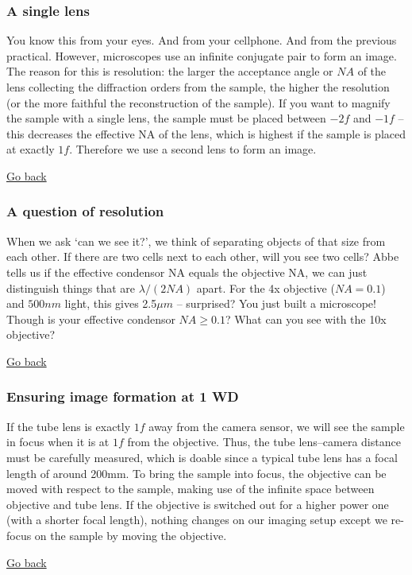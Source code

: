 \documentclass[a4paper]{report}
\begin{document}
	\subsubsection{A single lens}
	You know this from your eyes. And from your cellphone. And from the previous practical. However, microscopes use an infinite conjugate pair to form an image. The reason for this is resolution: the larger the acceptance angle or $NA$ of the lens collecting the diffraction orders from the sample, the higher the resolution (or the more faithful the reconstruction of the sample). If you want to magnify the sample with a single lens, the sample must be placed between $-2f$ and $-1f$ -- this decreases the effective NA of the lens, which is highest if the sample is placed at exactly $1f$. Therefore we use a second lens to form an image.

    \noindent
    \hyperlink{hintBack-imaging}{Go back}
    
	\subsubsection{A question of resolution}
	When we ask `can we see it?', we think of separating objects of that size from each other. If there are two cells next to each other, will you see two cells? Abbe tells us if the effective condensor NA equals the objective NA, we can just distinguish things that are $\lambda / (2NA)$ apart. For the 4x objective ($NA=0.1$) and $500nm$ light, this gives 2.5$\mu m$ -- surprised? You just built a microscope! Though is your effective condensor $NA\geq 0.1$? What can you see with the 10x objective?

    \noindent
    \hyperlink{hintBack-imaging}{Go back}
    
	\subsubsection{Ensuring image formation at 1 WD}
    If the tube lens is exactly $1f$ away from the camera sensor, we will see the sample in focus when it is at $1f$ from the objective. Thus, the tube lens--camera distance must be carefully measured, which is doable since a typical tube lens has a focal length of around 200mm. To bring the sample into focus, the objective can be moved with respect to the sample, making use of the infinite space between objective and tube lens. If the objective is switched out for a higher power one (with a shorter focal length), nothing changes on our imaging setup except we re-focus on the sample by moving the objective.

    \noindent
    \hyperlink{hintBack-imaging}{Go back}
    
    \clearpage
    
    
    
\end{document}
